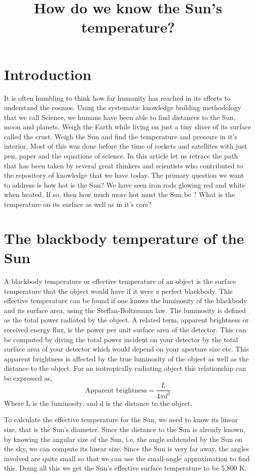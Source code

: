 \documentclass{../template/texnote}
\title{\textbf{How do we know the Sun's temperature?}}[author={Linn Abraham}]
\begin{document}
    \maketitle {}
\section{Introduction}
It is often humbling to think how far humanity has reached in its efforts to understand the cosmos.
Using the systematic knowledge building methodology that we call Science, we humans have been able to find distances to the Sun, moon and planets.
Weigh the Earth while living on just a tiny sliver of its surface called the crust.
Weigh the Sun and find the temperature and pressure in it's interior.
Most of this was done before the time of rockets and satellites with just pen, paper and the equations of science. In this article let us retrace the path that has been taken by several great thinkers and scientists who contributed to the repository of knowledge that we have today.
The primary question we want to address is how hot is the Sun? We have seen iron rods glowing red and white when heated. If so, then how much more hot must the Sun be ? What is the temperature on its surface as well as in it's core?
%
\section{The blackbody temperature of the Sun}
A blackbody temperature or effective temperature of an object is the surface temperature that the object would have if it were a perfect blackbody.
This effective temperature can be found if one knows the luminosity of the blackbody and its surface area, using the Steffan-Boltzmann law.
The luminosity is defined as the total power radiated by the object.
A related term, apparent brightness or received energy flux, is the power per unit surface area of the detector.
This can be computed by diving the total power incident on your detector by the total surface area of your detector which would depend on your aperture size etc.
This apparent brightness is affected by the true luminosity of the object as well as the distance to the object.
For an isotropically radiating object this relationship can be expressed as,
$$ \textrm{Apparent brightness} = \frac{L}{4\pi d^2} $$
Where L is the luminosity, and d is the distance to the object.


To calculate the effective temperature for the Sun, we need to know its linear size, that is the Sun's diameter.
Since the distance to the Sun is already known, by knowing the angular size of the Sun, i.e. the angle subtended by the Sun on the sky, we can compute its linear size.
Since the Sun is very far away, the angles involved are quite small so that we can use the small-angle approximation to find this.
Doing all this we get the Sun's effective surface temperature to be 5,800 K.
\end{document}
